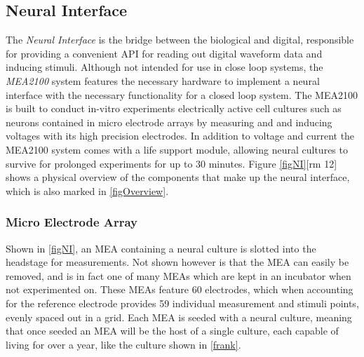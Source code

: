 \subsection{Neural Interface}
The \emph{Neural Interface} is the bridge between the biological and digital,
responsible for providing a convenient API for reading out digital waveform data
and inducing stimuli.
Although not intended for use in close loop systems, the \textit{MEA2100}
system features the necessary hardware to implement a neural interface with the
necessary functionality for a closed loop system.
The MEA2100 is built to conduct in-vitro experiments electrically active cell
cultures such as neurons contained in micro electrode arrays by measuring and
and inducing voltages with its high precision electrodes.
In addition to voltage and current the MEA2100 system comes with a life support
module, allowing neural cultures to survive for prolonged experiments for up to
30 minutes.
Figure \ref{figNI}[rm 12] shows a physical overview of the components that make up the
neural interface, which is also marked in \ref{figOverview}.
\subsubsection{Micro Electrode Array}
Shown in \ref{figNI}, an MEA containing a neural culture is slotted into the
headstage for measurements.
Not shown however is that the MEA can easily be removed, and is in fact one of
many MEAs which are kept in an incubator when not experimented on.
These MEAs feature 60 electrodes, which when accounting for the reference
electrode provides 59 individual measurement and stimuli points, evenly spaced
out in a grid.
Each MEA is seeded with a neural culture, meaning that once seeded an MEA will
be the host of a single culture, each capable of living for over a year, like
the culture shown in \ref{frank}.

